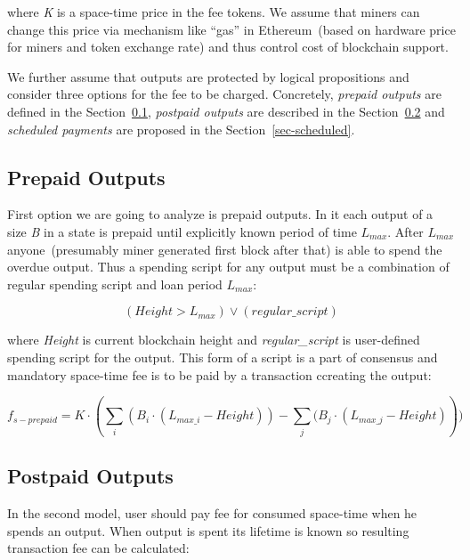 \documentclass[]{article}   %
\begin{document}
where \textit{K} is a space-time price in the fee tokens. We assume that miners can change this price via mechanism like ``gas'' in Ethereum~(based on hardware price for miners and token exchange rate) and thus control cost of blockchain support.

We further assume that outputs are protected by logical propositions and consider three options for the fee to be charged. Concretely, \textit{prepaid outputs} are defined in the Section~\ref{sec-prepaid}, \textit{postpaid outputs} are described in the Section~\ref{sec-postpaid} and \textit{scheduled payments} are proposed in the Section~\ref{sec-scheduled}.

\subsection{Prepaid Outputs}
\label{sec-prepaid}

First option we are going to analyze is prepaid outputs. In it each output of a size \textit{B} in a state is prepaid until explicitly known period of time $L_{max}$. After $L_{max}$ anyone~(presumably miner generated first block after that) is able to spend the overdue output. Thus a spending script for any output must be a combination of regular spending script and loan period $L_{max}$:

\begin{equation}
(Height > L_{max}) \lor (regular\_script)
\end{equation}

where \textit{Height} is current blockchain height and \textit{regular\_script} is user-defined spending script for the output. This form of a script is a part of consensus and mandatory space-time fee is to be paid by a transaction ccreating the output:

\begin{equation}
f_{s-prepaid} = K \cdot (\sum_i{(B_i \cdot (L_{max\_i} - Height))} - \sum_j{(B_j \cdot (L_{max\_j} - Height)}))
\end{equation}

\subsection{Postpaid Outputs}
\label{sec-postpaid}


In the second model, user should pay fee for consumed space-time when he spends an output. When output is spent its lifetime is known so resulting transaction fee can be calculated:
\end{document}
